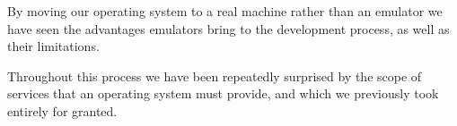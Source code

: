 \documentclass{report}
\begin{document}
By moving our operating system to a real machine rather than an emulator we
have seen the advantages emulators bring to the development process, as well
as their limitations.

Throughout this process we have been repeatedly surprised by the scope of
services that an operating system must provide, and which we previously took
entirely for granted.









\end{document}
